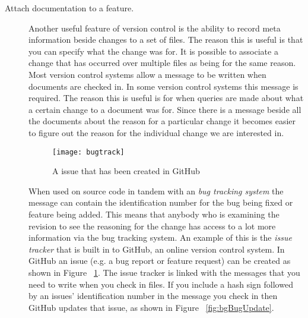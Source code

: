 \begin{description}

  \item [Attach documentation to a feature.]
  Another useful feature of version control is the ability to record meta information beside changes to a set of files.
  The reason this is useful is that you can specify what the change was for.
  It is possible to associate a change that has occurred over multiple files as being for the same reason.
  Most version control systems allow a message to be written when documents are checked in.
  In some version control systems this message is required.
  The reason this is useful is for when queries are made about what a certain change to a document was for.
  Since there is a message beside all the documents about the reason for a particular change it becomes easier to figure out the reason for the individual change we are interested in. 

  \begin{figure}[!t]
   \begin{center}
    \texttt{[image: bugtrack]}
   \end{center}
   \caption{A issue that has been created in GitHub}
   \label{fig:bgBugTrack}
  \end{figure}

  When used on source code in tandem with an \emph{bug tracking system} the message can contain the identification number for the bug being fixed or feature being added.
  This means that anybody who is examining the revision to see the reasoning for the change has access to a lot more information via the bug tracking system.
  An example of this is the \emph{issue tracker} that is built in to GitHub, an online version control system. In GitHub an issue (e.g. a bug report or feature request) can be created as shown in Figure ~\ref{fig:bgBugTrack}. 
  The issue tracker is linked with the messages that you need to write when you check in files.
  If you include a hash sign followed by an issues' identification number in the message you check in then GitHub updates that issue, as shown in Figure ~\ref{fig:bgBugUpdate}.


\end{description}
